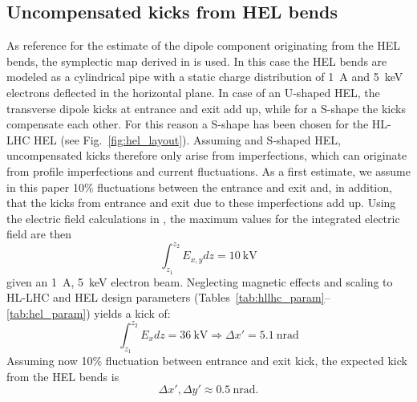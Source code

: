 \documentclass[%
 reprint,
 amsmath,amssymb,
 aps,
prstab,
]{revtex4-1}
\newcommand{\q}[2]{\ensuremath{#1\ \mathrm{#2}}} %
\begin{document}
\subsection{Uncompensated kicks from HEL bends}
\label{core:sec:1}
As reference for the estimate of the dipole component originating from the HEL bends, the symplectic map derived in \cite{hel_bends_stancari} is used. In this case the HEL bends are modeled as a cylindrical pipe with a static charge distribution of 1~A and 5~keV electrons deflected in the horizontal plane. In case of an U-shaped HEL, the transverse dipole kicks at entrance and exit add up, while for a S-shape the kicks compensate each other. For this reason a S-shape has been chosen for the HL-LHC HEL (see Fig.~\ref{fig:hel_layout}). Assuming and S-shaped HEL, uncompensated kicks therefore only arise from imperfections, which can originate from profile imperfections and current fluctuations. As a first estimate, we assume in this paper 10\% fluctuations between the entrance and exit and, in addition, that the kicks from entrance and exit due to these imperfections add up. Using the electric field calculations in \cite{hel_bends_stancari}, the maximum values for the integrated electric field are then
\begin{equation}
\int_{z_1}^{z_2} E_{x,y} dz= 10 \ \mathrm{kV}
\end{equation}
given an \SI{1}{A}, \SI{5}{keV} electron beam.
Neglecting magnetic effects and scaling to HL-LHC and HEL design parameters (Tables~\ref{tab:hllhc_param}--\ref{tab:hel_param}) yields a kick of:
\begin{equation}
\int_{z_1}^{z_2} E_{x} dz= 36 \ \mathrm{kV} \Rightarrow \Delta x'= \q{5.1}{nrad}
\end{equation}
Assuming now 10\% fluctuation between entrance and exit kick, the expected kick from the HEL bends is
\begin{equation}\label{eqn:kick_bends}
\Delta x', \Delta y'\approx \q{0.5}{nrad}.
\end{equation}
\end{document}
